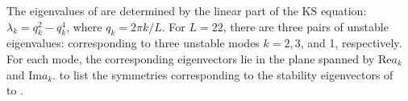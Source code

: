 
The eigenvalues of  are determined by the linear part of the KS
equation: $\lambda_k=q_k^2-q_k^4$, where $q_k = 2\pi k/L$.  For
$L=22$, there are three pairs of unstable eigenvalues: corresponding
to three unstable modes $k=2,3$, and 1, respectively.  For each
mode, the corresponding eigenvectors lie in the plane spanned by
$\mathrm{Re} a_k$ and $\mathrm{Im} a_k$.  to 
list the symmetries corresponding to the stability eigenvectors of
\eqva\  to .



